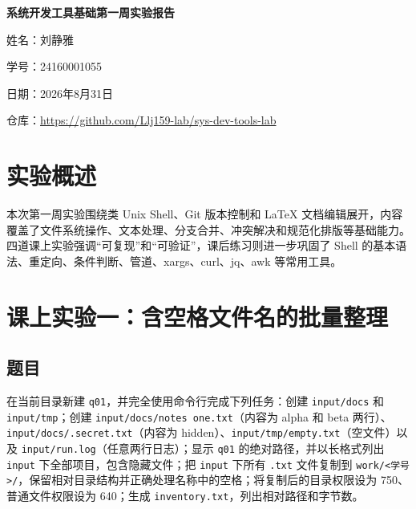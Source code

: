 \documentclass[UTF8,a4paper,12pt]{ctexart}
\begin{document}
\begin{titlepage}
    \thispagestyle{fancy}
    \centering
    \vspace*{2.5cm}
    {\bfseries 系统开发工具基础第一周实验报告\par}
    \vspace{3.8cm}
    {姓名：刘静雅\par}
    \vspace{0.45cm}
    {学号：24160001055\par}
    \vspace{0.45cm}
    {日期：2026年8月31日\par}
    \vspace{0.9cm}
    {仓库：\url{https://github.com/Llj159-lab/sys-dev-tools-lab}\par}
    \vfill
\end{titlepage}

\clearpage
\tableofcontents
\clearpage

\section{实验概述}

本次第一周实验围绕类 Unix Shell、Git 版本控制和 LaTeX 文档编辑展开，内容覆盖了文件系统操作、文本处理、分支合并、冲突解决和规范化排版等基础能力。四道课上实验强调“可复现”和“可验证”，课后练习则进一步巩固了 Shell 的基本语法、重定向、条件判断、管道、xargs、curl、jq、awk 等常用工具。

\section{课上实验一：含空格文件名的批量整理}

\subsection*{题目}
在当前目录新建 \texttt{q01}，并完全使用命令行完成下列任务：创建 \texttt{input/docs} 和 \texttt{input/tmp}；创建 \texttt{input/docs/notes one.txt}（内容为 alpha 和 beta 两行）、\texttt{input/docs/.secret.txt}（内容为 hidden）、\texttt{input/tmp/empty.txt}（空文件）以及 \texttt{input/run.log}（任意两行日志）；显示 \texttt{q01} 的绝对路径，并以长格式列出 \texttt{input} 下全部项目，包含隐藏文件；把 \texttt{input} 下所有 \texttt{.txt} 文件复制到 \texttt{work/<学号>/}，保留相对目录结构并正确处理名称中的空格；将复制后的目录权限设为 750、普通文件权限设为 640；生成 \texttt{inventory.txt}，列出相对路径和字节数。
\end{document}
